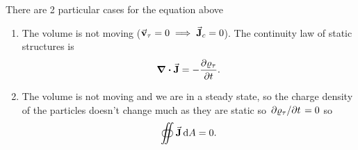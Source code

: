 There are 2 particular cases for the equation above
\begin{enumerate}
	\item The volume is not moving ($\va{v}_\tau=0 \implies \va{J}_c=0$). The continuity law of static structures is
	      \begin{equation}
		      \div{\va{J}}=-\pdv{\varrho_\tau}{t}
		      .\end{equation}
	\item The volume is not moving and we are in a steady state, so the charge density of the particles doesn't change much as they are static so $\pdv*{\varrho_\tau}{t}=0 $ so
	      \begin{equation}
		      \oiint \va{J}\dd {A}=0
		      .\end{equation}
\end{enumerate}
